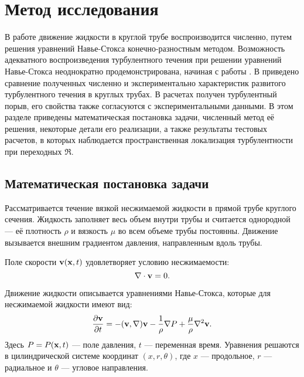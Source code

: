 
\chapter{Метод исследования}

В работе движение жидкости в круглой трубе воспроизводится численно, путем решения уравнений Навье-Стокса конечно-разностным методом. Возможность адекватного воспроизведения турбулентного течения при решении уравнений Навье-Стокса неоднократно продемонстрирована, начиная с работы \cite{Kim1987}. В \cite{Priymak1998, Nikitin2006} приведено сравнение полученных численно и экспериментально характеристик развитого турбулентного течения в круглых трубах. В расчетах \cite{Priymak2004} получен турбулентный порыв, его свойства также согласуются с экспериментальными данными. В этом разделе приведены математическая постановка задачи, численный метод её решения, некоторые детали его реализации, а также результаты тестовых расчетов, в которых наблюдается пространственная локализация турбулентности при переходных $\Re$. 


\section{Математическая постановка задачи} \label{math_section}

Рассматривается течение вязкой несжимаемой жидкости в прямой трубе круглого сечения. Жидкость заполняет весь объем внутри трубы и считается однородной --- её плотность $\rho$ и вязкость $\mu$ во всем объеме трубы постоянны. Движение вызывается внешним градиентом давления, направленным вдоль трубы.


Поле скорости $\mathbf{v}(\mathbf{x},t)$ удовлетворяет условию несжимаемости:
\begin{equation} \label{eq0}
\nabla \cdot \mathbf{v} = 0.
\end{equation}

Движение жидкости описывается уравнениями Навье-Стокса, которые для несжимаемой жидкости имеют вид:
\begin{equation} \label{NSeq_dynamic}
\frac{\partial \mathbf{v}}{\partial t} = - (\mathbf{v}, \nabla) \mathbf{v} - \frac{1}{\rho}\nabla P + \frac{\mu}{\rho} \nabla^2 \mathbf{v}.
\end{equation}
Здесь $P = P(\mathbf{x},t)$ --- поле давления, $t$ --- переменная время. Уравнения решаются в цилиндрической системе координат $(x,r,\theta)$, где $x$ --- продольное, $r$ --- радиальное и $\theta$ --- угловое направления. 


